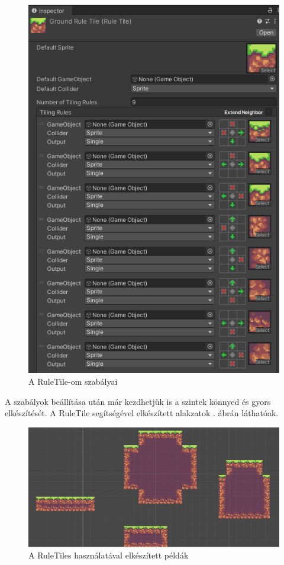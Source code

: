 \begin{figure}[ht]
\centering
\includegraphics[scale = 0.5]{images/ruletilerules.png}
\caption{A RuleTile-om szabályai}
\label{fig:ruletilerules}
\end{figure}

\newpage
A szabályok beállítása után már kezdhetjük is a szintek könnyed és gyors elkészítését.\cite{unityruletile} A RuleTile segítségével elkészített alakzatok . ábrán láthatóak.

\begin{figure}[ht]
\centering
\includegraphics[scale = 0.5]{images/ruletileshapes.png}
\caption{A RuleTiles használatával elkészített példák}
\label{fig:ruletileshapes}
\end{figure}

